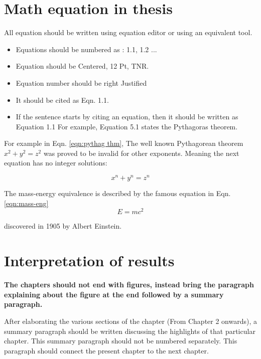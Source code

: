 \section{Math equation in thesis}
All equation should be written using equation editor or using an equivalent tool.
\begin{itemize}
	\item Equations should be numbered as : 1.1, 1.2 ...
	\item Equation should be Centered, 12 Pt, TNR. 
	\item Equation number should be right Justified
	\item It should be cited as Eqn. 1.1.
   \item If the sentence starts by citing an equation, then it should be written as Equation 1.1 For example, Equation 5.1 states the Pythagoras theorem.

	
\end{itemize}

For example in Eqn. \ref{eqn:pythag thm}, The well known Pythagorean theorem $x^2 + y^2 = z^2$ was 
proved to be invalid for other exponents. 
Meaning the next equation has no integer solutions:

\begin{equation}
\label{eqn:pythag thm}
	x^n + y^n = z^n
\end{equation}

The mass-energy equivalence is described by the famous equation in Eqn. \ref{eqn:mass-eng}
\begin{equation}
\label{eqn:mass-eng}
	E=mc^2
\end{equation}

discovered in 1905 by Albert Einstein. 

\section{Interpretation of results}

\vspace{2.5cm}

 \textbf{The chapters should not end with figures, instead bring the paragraph explaining about the figure at the end followed by a summary paragraph.}

After elaborating the various sections of the chapter (From Chapter 2 onwards), a summary paragraph should be written discussing the highlights of that particular chapter. This summary paragraph should not be numbered separately. This paragraph should connect the present chapter to the next chapter.



